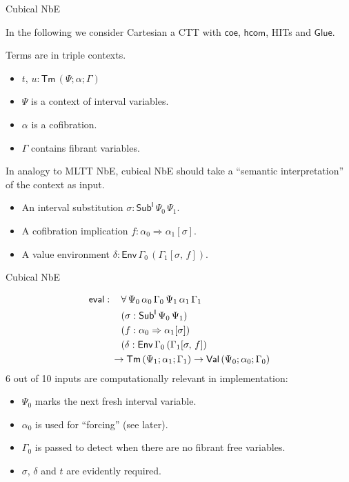 \documentclass[dvipsnames]{beamer}
\newcommand{\ms}[1]{\mathsf{#1}}
\newcommand{\Sub}{\mathsf{Sub}}
\newcommand{\Tm}{\mathsf{Tm}}
\newcommand{\coe}{\mathsf{coe}}
\newcommand{\Env}{\ms{Env}}
\newcommand{\Val}{\ms{Val}}
\newcommand{\eval}{\ms{eval}}
\newcommand{\I}{\ms{I}}
\newcommand{\hcom}{\ms{hcom}}
\newcommand{\Glue}{\ms{Glue}}
\begin{document}
\begin{frame}{Cubical NbE}

In the following we consider Cartesian a CTT with $\coe$, $\hcom$, HITs and $\Glue$.
\vspace{0.5em}
\pause

Terms are in triple contexts.
\begin{itemize}
 \item $t,\,u : \Tm\,(\Psi;\alpha;\Gamma)$
 \item $\Psi$ is a context of interval variables.
 \item $\alpha$ is a cofibration.
 \item $\Gamma$ contains fibrant variables.
\end{itemize}
\vspace{1em}
\pause
In analogy to MLTT NbE, cubical NbE should take a ``semantic interpretation'' of
the context as input.
\begin{itemize}
 \item An interval substitution $\sigma : \Sub^\I\,\Psi_0\,\Psi_1$.
 \item A cofibration implication $f : \alpha_0 \Rightarrow \alpha_1[\sigma]$.
 \item A value environment $\delta : \Env\,\Gamma_0\,(\Gamma_1[\sigma,\,f])$.
\end{itemize}

\end{frame}

\begin{frame}{Cubical NbE}

\begin{alignat*}{3}
  & \eval :\,&&\forall\,\Psi_0\,\alpha_0\,\Gamma_0\,\Psi_1\,\alpha_1\,\Gamma_1\\
  &       && (\sigma : \Sub^\I\,\Psi_0\,\Psi_1)\\
  &       && (f : \alpha_0 \Rightarrow \alpha_1[\sigma])\\
  &       && (\delta : \Env\,\Gamma_0\,(\Gamma_1[\sigma,\,f])\\
  & && \hspace{-1em}\to \Tm\,(\Psi_1;\alpha_1;\Gamma_1) \to \Val\,(\Psi_0;\alpha_0;\Gamma_0)
\end{alignat*}
\pause
\alert{6 out of 10} inputs are computationally relevant in implementation:
\begin{itemize}
\item $\Psi_0$ marks the next fresh interval variable.
\pause
\item $\alpha_0$ is used for ``forcing'' (see later).
\pause
\item $\Gamma_0$ is passed to detect when there are no fibrant free variables.
\pause
\item $\sigma$, $\delta$ and $t$ are evidently required.
\end{itemize}
\end{frame}
\end{document}
